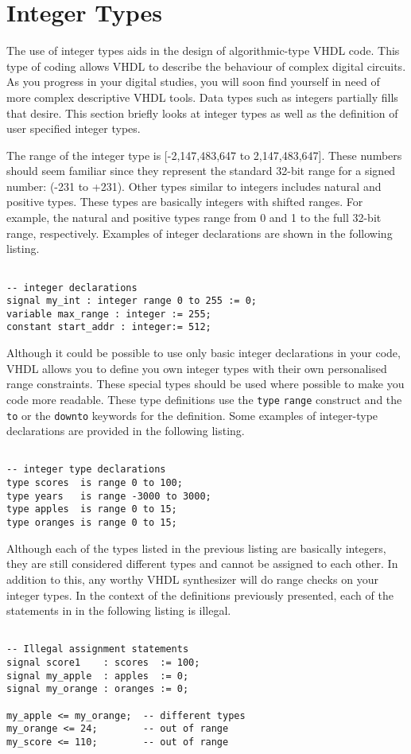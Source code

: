 \section{Integer Types}
The use of integer types aids in the design of algorithmic-type VHDL code. This type of coding allows VHDL to describe the behaviour of complex digital circuits. As you progress in your digital studies, you will soon find yourself in need of more complex descriptive VHDL tools. Data types such as integers partially fills that desire. This section briefly looks at integer types as well as the definition of user specified integer types.

The range of the integer type is [-2,147,483,647 to 2,147,483,647]. These numbers should seem familiar since they represent the standard 32-bit range for a signed number: (-231 to +231). Other types similar to integers includes natural and positive types. These types are basically integers with shifted ranges. For example, the natural and positive types range from 0 and 1 to the full 32-bit range, respectively. Examples of integer declarations are shown in the following listing.
\vspace{8pt}
\begin{lstlisting}

-- integer declarations
signal my_int : integer range 0 to 255 := 0;
variable max_range : integer := 255;
constant start_addr : integer:= 512;
\end{lstlisting}

Although it could be possible to use only basic integer declarations in your code, VHDL allows you to define you own integer types with their own personalised range constraints. These special types should be used where possible to make you code more readable. These type definitions use the \texttt{type} \texttt{range} construct and the \texttt{to} or the \texttt{downto} keywords for the definition. Some examples of integer-type declarations are provided in the following listing.
\vspace{8pt}
\begin{lstlisting}

-- integer type declarations
type scores  is range 0 to 100; 
type years   is range -3000 to 3000; 
type apples  is range 0 to 15; 
type oranges is range 0 to 15; 
\end{lstlisting}

Although each of the types listed in the previous listing are basically integers, they are still considered different types and cannot be assigned to each other. In addition to this, any worthy VHDL synthesizer will do range checks on your integer types. In the context of the definitions previously presented, each of the statements in in the following listing is illegal. 
\vspace{8pt}
\begin{lstlisting}

-- Illegal assignment statements
signal score1    : scores  := 100;  
signal my_apple  : apples  := 0; 
signal my_orange : oranges := 0; 

my_apple <= my_orange;  -- different types
my_orange <= 24;        -- out of range
my_score <= 110;        -- out of range
\end{lstlisting}

